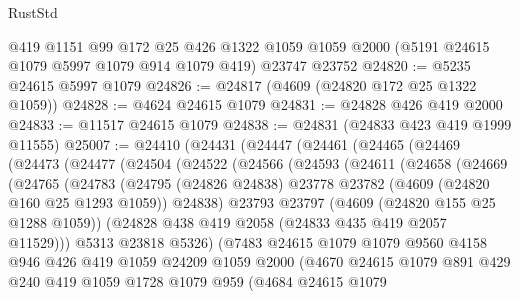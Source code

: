 \begin{lexlean}{RustStd}
\begin{coremodule}
{\begin{coremodule}
{{{{{{{{{{{{{{{{{{{{{{{{{{{{{{{{{{{    @419
    @1151
    @99
    @172
    @25
    @426
    @1322
    @1059
    @1059
    @2000
    (@5191 @24615 @1079 @5997 @1079 @914 @1079 @419)
    @23747
    @23752
@24820 := @5235 @24615 @5997 @1079
@24826 := @24817 (@4609 (@24820 @172 @25 @1322 @1059))
@24828 := @4624 @24615 @1079
@24831 := @24828 @426 @419 @2000
@24833 := @11517 @24615 @1079
@24838 := @24831 (@24833 @423 @419 @1999 @11555)
@25007 := @24410
    (@24431
      (@24447
        (@24461
          (@24465
            (@24469
              (@24473
                (@24477
                  (@24504
                    (@24522
                      (@24566
                        (@24593
                          (@24611
                            (@24658
                              (@24669
                                (@24765
                                  (@24783
                                    (@24795
                                      (@24826 @24838)
                                      @23778
                                      @23782
                                      (@4609 (@24820 @160 @25 @1293 @1059))
                                      @24838)
                                    @23793
                                    @23797
                                    (@4609 (@24820 @155 @25 @1288 @1059))
                                    (@24828 @438 @419 @2058 (@24833 @435 @419 @2057 @11529)))
                                  @5313
                                  @23818
                                  @5326)
                                (@7483
                                  @24615
                                  @1079
                                  @1079
                                  @9560
                                  @4158
                                  @946
                                  @426
                                  @419
                                  @1059
                                  @24209
                                  @1059
                                  @2000
                                  (@4670
                                    @24615
                                    @1079
                                    @891
                                    @429
                                    @240
                                    @419
                                    @1059
                                    @1728
                                    @1079
                                    @959
                                    (@4684
                                      @24615
                                      @1079
}}}}}}}}}}}}}}}}}}}}}}}}}}}}}}}}}}}
\end{coremodule}}
\end{coremodule}
\end{lexlean}
